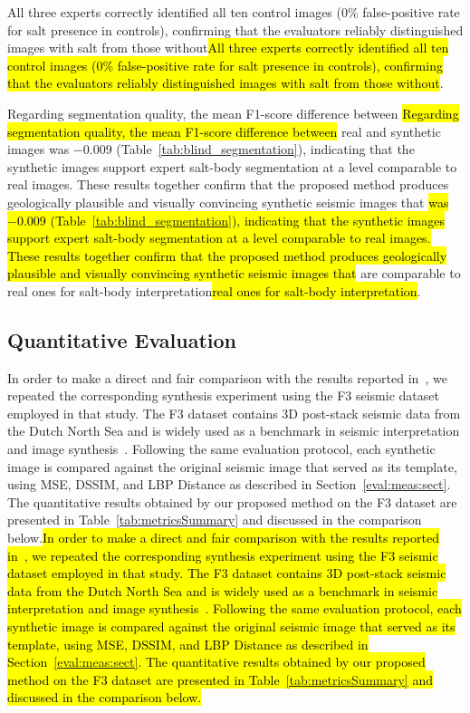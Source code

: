 \documentclass{ieeeaccess}
\makeatletter
\DeclareRobustCommand{\DIFaddbegin}{\DIFOaddbegin \let\includegraphics\DIFaddincludegraphics} %
\DeclareRobustCommand{\DIFaddend}{\DIFOaddend \let\includegraphics\DIFOincludegraphics} %
\DeclareRobustCommand{\DIFdelbegin}{\DIFOdelbegin \let\includegraphics\DIFdelincludegraphics} %
\DeclareRobustCommand{\DIFdelend}{\DIFOaddend \let\includegraphics\DIFOincludegraphics} %
\let\sout@orig\sout %
\renewcommand{\sout}[1]{\ifmmode\text{\sout@orig{\ensuremath{#1}}}\else\sout@orig{#1}\fi} %
\providecommand{\DIFadd}[1]{{\protect\color{blue}#1}}
\providecommand{\DIFdel}[1]{{\protect\color{red}\sout{#1}}}
\renewcommand{\DIFadd}[1]{\ifmmode#1\else\begingroup\let\protect\relax\hl{#1}\endgroup\fi}
\renewcommand{\DIFdel}[1]{}
\providecommand{\DIFaddbegin}{}
\providecommand{\DIFaddend}{}
\providecommand{\DIFdelbegin}{}
\providecommand{\DIFdelend}{}
\renewcommand{\DIFaddbegin}{}
\renewcommand{\DIFaddend}{}
\renewcommand{\DIFdelbegin}{}
\renewcommand{\DIFdelend}{}
\makeatother
\begin{document}
\DIFdelbegin \DIFdel{Table~\ref{tab:synthetic_images_evaluation} shows the evaluation  results for 30 synthetic seismic images , showing an average precision of 0.87539, which suggests that experts identifications of the synthetic saline rock portions were 87.5\% correct, with 12.5\% misidentified as salt, which actually was common rock. The average recall was 0.86536 in the synthetic seismic images, indicating that 86.5\% of the synthetic saline rock portions were effectively identified, and 13.5\% were missed since these pixels were not identified as salt. Finally, the average F1-score achieved 0.86901 for the synthetic images , considering all evaluations on synthetic images made by the experts}\DIFdelend \DIFaddbegin \DIFadd{All three experts correctly identified all ten control images (0\% false-positive rate for salt presence in controls), confirming that the evaluators reliably distinguished images with salt from those without}\DIFaddend .

\DIFdelbegin \DIFdel{Comparing the results of the geoscience specialist evaluation of }\DIFdelend \DIFaddbegin \DIFadd{Regarding segmentation quality, the mean F1-score difference between }\DIFaddend real and synthetic \DIFdelbegin \DIFdel{seismic images , a small difference of less than 2\% can be observed in favor of the real images. Therefore, from the perspective of the specialists evaluations, the synthetic seismic images are virtually indistinguishable from the real seismic images. In that sense, we can conclude that, from the point of view of the geoscience specialists consulted, the synthetic }\DIFdelend images \DIFaddbegin \DIFadd{was $-0.009$ (Table~\protect\ref{tab:blind_segmentation}), indicating that the synthetic images support expert salt-body segmentation at a level comparable to real images. These results together confirm that the proposed method produces geologically plausible and visually convincing synthetic seismic images that }\DIFaddend are comparable to \DIFdelbegin \DIFdel{the real seismic images}\DIFdelend \DIFaddbegin \DIFadd{real ones for salt-body interpretation}\DIFaddend .

\subsection{Quantitative Evaluation}

\DIFaddbegin \DIFadd{In order to make a direct and fair comparison with the results reported in~\cite{Ferreira2020}, we repeated the corresponding synthesis experiment using the F3 seismic dataset employed in that study. The F3 dataset contains 3D post-stack seismic data from the Dutch North Sea and is widely used as a benchmark in seismic interpretation and image synthesis~\cite{Baroni2018}. Following the same evaluation protocol, each synthetic image is compared against the original seismic image that served as its template, using MSE, DSSIM, and LBP Distance as described in Section~\ref{eval:meas:sect}. The quantitative results obtained by our proposed method on the F3 dataset are presented in Table~\ref{tab:metricsSummary} and discussed in the comparison below.}\DIFaddend
\end{document}
